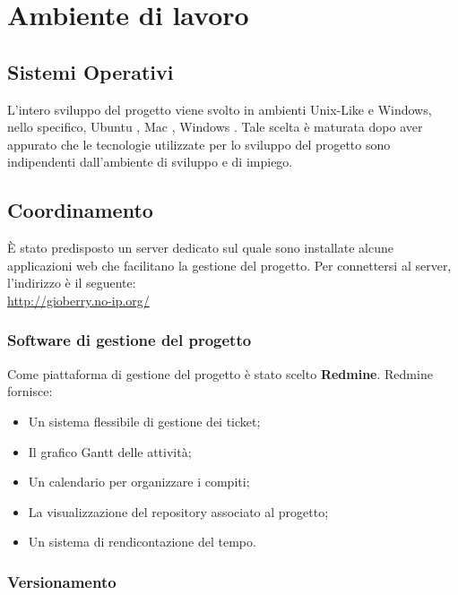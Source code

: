 
\section{Ambiente di lavoro} 

\subsection{Sistemi Operativi}

L’intero sviluppo del progetto viene svolto in ambienti Unix-Like e Windows, nello specifico, Ubuntu , Mac , Windows . Tale scelta è maturata dopo aver appurato che le tecnologie utilizzate per lo sviluppo del progetto sono indipendenti dall’ambiente di sviluppo e di impiego.

\subsection{Coordinamento}

È stato predisposto un server dedicato sul quale sono installate alcune applicazioni web
che facilitano la gestione del progetto. Per connettersi al server, l'indirizzo è il seguente:\\
\url{http://gioberry.no-ip.org/}
\subsubsection{Software di gestione del progetto} 
\label{sec:Software di gestione del prodotto}
Come piattaforma di gestione del progetto è stato scelto \textbf{Redmine}. Redmine fornisce:
\begin{itemize}
\item Un sistema flessibile di gestione dei ticket;
\item Il grafico Gantt delle attività;
\item Un calendario per organizzare i compiti;
\item La visualizzazione del repository associato al progetto;
\item Un sistema di rendicontazione del tempo.
\end{itemize}


\subsubsection{Versionamento}


